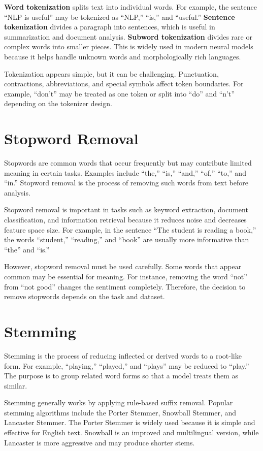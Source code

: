 \documentclass[10pt]{article}
\begin{document}
\textbf{Word tokenization} splits text into individual words. For example, the sentence ``NLP is useful'' may be tokenized as ``NLP,'' ``is,'' and ``useful.'' \textbf{Sentence tokenization} divides a paragraph into sentences, which is useful in summarization and document analysis. \textbf{Subword tokenization} divides rare or complex words into smaller pieces. This is widely used in modern neural models because it helps handle unknown words and morphologically rich languages.

Tokenization appears simple, but it can be challenging. Punctuation, contractions, abbreviations, and special symbols affect token boundaries. For example, ``don't'' may be treated as one token or split into ``do'' and ``n't'' depending on the tokenizer design.

\section{Stopword Removal}

Stopwords are common words that occur frequently but may contribute limited meaning in certain tasks. Examples include ``the,'' ``is,'' ``and,'' ``of,'' ``to,'' and ``in.'' Stopword removal is the process of removing such words from text before analysis.

Stopword removal is important in tasks such as keyword extraction, document classification, and information retrieval because it reduces noise and decreases feature space size. For example, in the sentence ``The student is reading a book,'' the words ``student,'' ``reading,'' and ``book'' are usually more informative than ``the'' and ``is.''

However, stopword removal must be used carefully. Some words that appear common may be essential for meaning. For instance, removing the word ``not'' from ``not good'' changes the sentiment completely. Therefore, the decision to remove stopwords depends on the task and dataset.

\section{Stemming}

Stemming is the process of reducing inflected or derived words to a root-like form. For example, ``playing,'' ``played,'' and ``plays'' may be reduced to ``play.'' The purpose is to group related word forms so that a model treats them as similar.

Stemming generally works by applying rule-based suffix removal. Popular stemming algorithms include the Porter Stemmer, Snowball Stemmer, and Lancaster Stemmer. The Porter Stemmer is widely used because it is simple and effective for English text. Snowball is an improved and multilingual version, while Lancaster is more aggressive and may produce shorter stems.
\end{document}
